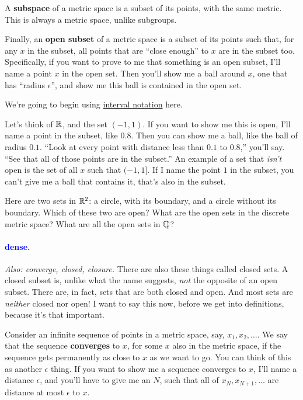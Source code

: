 \documentclass[11pt,paper=letter]{scrartcl}
\renewcommand{\bluebf}[1]{{\bfseries \color{Blue} #1}}
\renewcommand\wp[1]{\paragraph{\textcolor{Blue}{#1.}} \hspace{-1em}}
\newcommand\wl[1]{\label{w:#1}}
\newcommand\oww[1]{\textit{Also: #1.}}
\begin{document}
A \textbf{subspace} of a metric space is a subset of its points, with the same metric. This is always a metric space, unlike subgroups.

Finally, an \bluebf{open subset} of a metric space is a subset of its points such that, for any $x$ in the subset, all points that are ``close enough'' to $x$ are in the subset too. Specifically, if you want to prove to me that something is an open subset, I'll name a point $x$ in the open set. Then you'll show me a ball around $x$, one that has ``radius $\epsilon$'', and show me this ball is contained in the open set.

\begin{remboxed}
  We're going to begin using \href{https://en.wikipedia.org/wiki/Interval_(mathematics)}{interval notation} here.
\end{remboxed}

Let's think of $\mathbb R$, and the set $(-1, 1)$. If you want to show me this is open, I'll name a point in the subset, like $0.8$. Then you can show me a ball, like the ball of radius $0.1$. ``Look at every point with distance less than $0.1$ to $0.8$,'' you'll say. ``See that all of those points are in the subset.'' An example of a set that \textit{isn't} open is the set of all $x$ such that $(-1, 1]$. If I name the point $1$ in the subset, you can't give me a ball that contains it, that's also in the subset.

\begin{exrboxed}
  Here are two sets in $\mathbb R^2$: a circle, with its boundary, and a circle without its boundary. Which of these two are open? What are the open sets in the discrete metric space? What are all the open sets in $\mathbb Q$?
\end{exrboxed}

\wp{dense}
\wl{dense}
\oww{converge, closed, closure}
There are also these things called closed sets. A closed subset is, unlike what the name suggests, \textit{not} the opposite of an open subset. There are, in fact, sets that are both closed and open. And most sets are \textit{neither} closed nor open! I want to say this now, before we get into definitions, because it's that important.

Consider an infinite sequence of points in a metric space, say, $ x_1, x_2 , \ldots $. We say that the sequence \textbf{converges} to $ x $, for some $x$ also in the metric space, if the sequence gets permanently as close to $x$ as we want to go. You can think of this as another $\epsilon$ thing. If you want to show me a sequence converges to $x$, I'll name a distance $\epsilon$, and you'll have to give me an $N$, such that all of $x_N, x_{N+1}, \ldots$ are distance at most $\epsilon$ to $x$.
\end{document}
